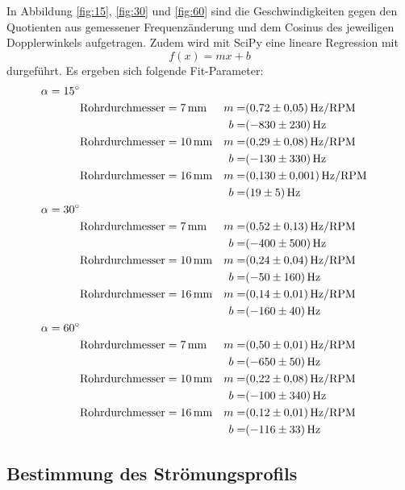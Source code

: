 In Abbildung \ref{fig:15}, \ref{fig:30} und \ref{fig:60} sind die Geschwindigkeiten gegen den Quotienten aus gemessener Frequenzänderung und dem Cosinus des jeweiligen
Dopplerwinkels aufgetragen.
Zudem wird mit SciPy eine lineare Regression mit
\begin{equation}
  f(x)= mx + b
\end{equation}
durgeführt.
Es ergeben sich folgende Fit-Parameter:
\begin{align*}
	\alpha = \SI{15}{\degree} 	& \\
								& \text{Rohrdurchmesser}=\SI{7}{\milli\meter} 	& m=&\SI{0.72\pm0.05}{\hertz\per RPM}\\
								&												& b=&\SI{-830\pm230}{\hertz}\\
								& \text{Rohrdurchmesser}=\SI{10}{\milli\meter} 	& m=&\SI{0.29\pm0.08}{\hertz\per RPM}\\
								&												& b=&\SI{-130\pm330}{\hertz}\\
								& \text{Rohrdurchmesser}=\SI{16}{\milli\meter} 	& m=&\SI{0.130\pm0.001}{\hertz\per RPM}\\
								&												& b=&\SI{19\pm5}{\hertz}\\
	\alpha = \SI{30}{\degree} 	& \\
								& \text{Rohrdurchmesser}=\SI{7}{\milli\meter} 	& m=&\SI{0.52\pm0.13}{\hertz\per RPM}\\
								&												& b=&\SI{-400\pm500}{\hertz}\\
								& \text{Rohrdurchmesser}=\SI{10}{\milli\meter} 	& m=&\SI{0.24\pm0.04}{\hertz\per RPM}\\
								&												& b=&\SI{-50\pm160}{\hertz}\\
								& \text{Rohrdurchmesser}=\SI{16}{\milli\meter} 	& m=&\SI{0.14\pm0.01}{\hertz\per RPM}\\
								&												& b=&\SI{-160\pm40}{\hertz}\\
	\alpha = \SI{60}{\degree} 	& \\
								& \text{Rohrdurchmesser}=\SI{7}{\milli\meter} 	& m=&\SI{0.50\pm0.01}{\hertz\per RPM}\\
								&												& b=&\SI{-650\pm50}{\hertz}\\
								& \text{Rohrdurchmesser}=\SI{10}{\milli\meter} 	& m=&\SI{0.22\pm0.08}{\hertz\per RPM}\\
								&												& b=&\SI{-100\pm340}{\hertz}\\
								& \text{Rohrdurchmesser}=\SI{16}{\milli\meter} 	& m=&\SI{0.12\pm0.01}{\hertz\per RPM}\\
								&												& b=&\SI{-116\pm33}{\hertz}\\
\end{align*}




\subsection{Bestimmung des Strömungsprofils}
